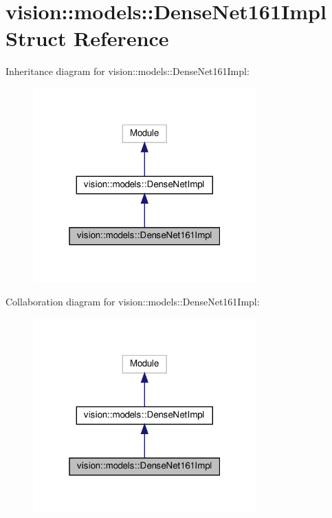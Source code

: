 \hypertarget{structvision_1_1models_1_1DenseNet161Impl}{}\section{vision\+:\+:models\+:\+:Dense\+Net161\+Impl Struct Reference}
\label{structvision_1_1models_1_1DenseNet161Impl}


Inheritance diagram for vision\+:\+:models\+:\+:Dense\+Net161\+Impl\+:
\nopagebreak
\begin{figure}[H]
\begin{center}
\leavevmode
\includegraphics[width=244pt]{structvision_1_1models_1_1DenseNet161Impl__inherit__graph}
\end{center}
\end{figure}


Collaboration diagram for vision\+:\+:models\+:\+:Dense\+Net161\+Impl\+:
\nopagebreak
\begin{figure}[H]
\begin{center}
\leavevmode
\includegraphics[width=244pt]{structvision_1_1models_1_1DenseNet161Impl__coll__graph}
\end{center}
\end{figure}
